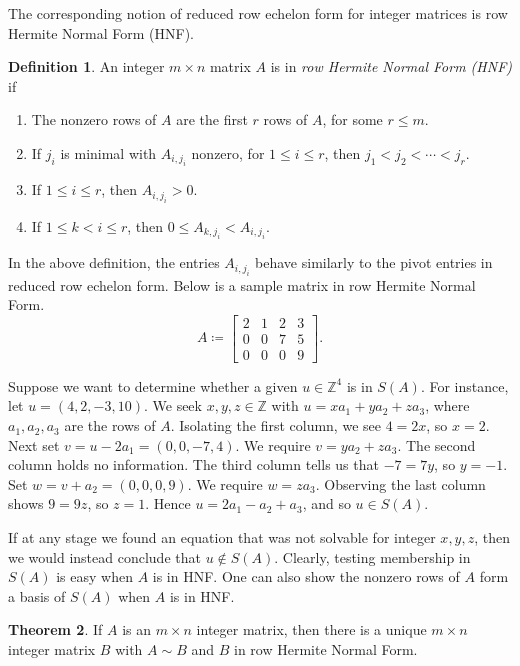 \documentclass[12pt,a4paper,answers]{exam}
\newcommand{\Z}{\mathbb{Z}}
\theoremstyle{definition}
\newtheorem{theorem}{Theorem}[section]
\newtheorem{definition}[theorem]{Definition}
\begin{document}
The corresponding notion of reduced row echelon form for integer matrices is row Hermite Normal Form (HNF).

\begin{definition}
  An integer $m\times n$ matrix $A$ is in \emph{row Hermite Normal Form (HNF)} if
  \begin{enumerate}
  \item The nonzero rows of $A$ are the first $r$ rows of $A$, for some $r\leq m$.
  \item If $j_i$ is minimal with $A_{i,j_i}$ nonzero, for $1\leq i\leq r$, then $j_1<j_2<\cdots<j_r$.
  \item If $1\leq i\leq r$, then $A_{i,j_i}>0$.
  \item If $1\leq k<i\leq r$, then $0\leq A_{k,j_i}<A_{i,j_i}$.
  \end{enumerate}
\end{definition}

In the above definition, the entries $A_{i,j_i}$ behave similarly to the pivot entries in reduced row echelon form. Below is a sample matrix in row Hermite Normal Form.
\[ A \coloneqq
  \begin{bmatrix}
    2 & 1 & 2 & 3 \\
    0 & 0 & 7 & 5 \\
    0 & 0 & 0 & 9
  \end{bmatrix}.
\]

Suppose we want to determine whether a given $u\in\Z^4$ is in $S(A)$. For instance, let $u=(4,2,-3,10)$. We seek $x,y,z\in\Z$ with $u=xa_1+ya_2+za_3$, where $a_1,a_2,a_3$ are the rows of $A$. Isolating the first column, we see $4=2x$, so $x=2$. Next set $v=u-2a_1=(0,0,-7,4)$. We require $v=ya_2+za_3$. The second column holds no information. The third column tells us that $-7=7y$, so $y=-1$. Set $w=v+a_2=(0,0,0,9)$. We require $w=za_3$. Observing the last column shows $9=9z$, so $z=1$. Hence $u=2a_1-a_2+a_3$, and so $u\in S(A)$.

If at any stage we found an equation that was not solvable for integer $x,y,z$, then we would instead conclude that $u\notin S(A)$. Clearly, testing membership in $S(A)$ is easy when $A$ is in HNF. One can also show the nonzero rows of $A$ form a basis of $S(A)$ when $A$ is in HNF.

\begin{theorem}
  If $A$ is an $m\times n$ integer matrix, then there is a unique $m\times n$ integer matrix $B$ with $A\sim B$ and $B$ in row Hermite Normal Form.
\end{theorem}
\end{document}
